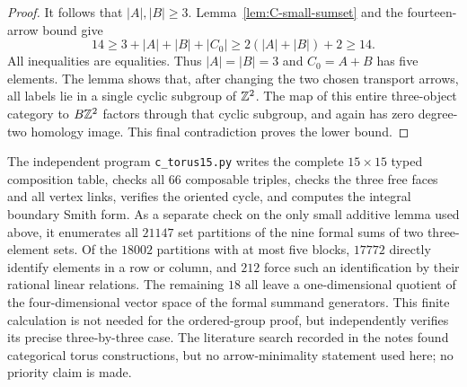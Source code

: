 \begin{proof}
It follows that $|A|,|B|\ge3$. Lemma~\ref{lem:C-small-sumset}
and the fourteen-arrow bound give
\[
 14\ge 3+|A|+|B|+|C_0|
 \ge 2(|A|+|B|)+2\ge14.
\]
All inequalities are equalities. Thus $|A|=|B|=3$ and
$C_0=A+B$ has five elements. The lemma shows that, after changing
the two chosen transport arrows, all labels lie in a single cyclic
subgroup of $\mathbb Z^2$. The map of this entire three-object category to
$B\mathbb Z^2$ factors through that cyclic subgroup, and again has zero
degree-two homology image. This final contradiction proves the
lower bound.
\end{proof}

\begin{remark}\label{rem:C-torus-certificate}
The independent program \texttt{c\_torus15.py} writes the complete
$15\times15$ typed composition table, checks all $66$ composable
triples, checks the three free faces and all vertex links, verifies
the oriented cycle, and computes the integral boundary Smith form.
As a separate check on the only small additive lemma used above,
it enumerates all $21147$ set partitions of the nine formal sums
of two three-element sets. Of the $18002$ partitions with at most
five blocks, $17772$ directly identify elements in a row or column,
and $212$ force such an identification by their rational linear
relations. The remaining $18$ all leave a one-dimensional quotient
of the four-dimensional vector space of the formal summand generators.
This finite calculation is not needed for the ordered-group proof,
but independently verifies its precise three-by-three case.
The literature search recorded in the notes found categorical torus
constructions, but no arrow-minimality statement used here; no priority
claim is made.
\end{remark}
